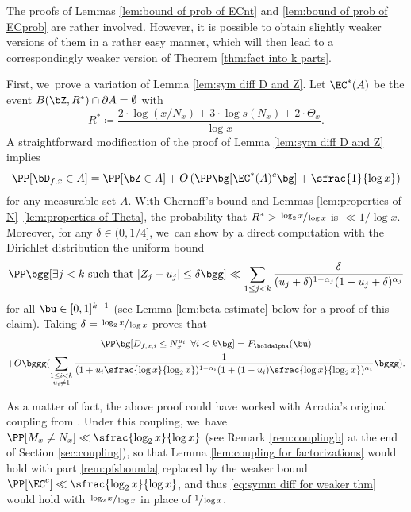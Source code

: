 \skpt
\begin{remss}
\begin{enumeratea}
\item\label{rem:pfsbounda}
The proofs of Lemmas \ref{lem:bound of prob of ECnt} and \ref{lem:bound of prob of ECprob} are rather involved. However, it is possible to obtain slightly weaker versions of them in a rather easy manner, which will then lead to a correspondingly weaker version of Theorem \ref{thm:fact into k parts}.

First, we~prove a variation of Lemma \ref{lem:sym diff D and Z}. Let $\EC^*(A)$ be the event $B(\bZ,R^*)\cap \partial A=\emptyset$ with
\[
R^* \coloneqq \frac{2\cdot \log(x/N_x) + 3\cdot \log s(N_x) + 2\cdot \Theta_x}{\log x}.
\]
A straightforward modification of the proof of Lemma \ref{lem:sym diff D and Z} implies
\begin{equation}
\label{eq:symm diff for weaker thm}
\PP[\bD_{f, x} \in A] = \PP[\bZ \in A] + O\left(\PP\bg[\EC^*(A)^c\bg] + \sfrac{1}{\log x}\right)
\end{equation}
for any measurable set $A$. With Chernoff's bound and Lemmas \ref{lem:properties of N}--\ref{lem:properties of Theta}, the probability that $R^*>\sfrac{\log_2 x}{\log x}$ is $\ll 1/\log x$. Moreover, for any $\delta\in(0,1/4]$, we~can show by a direct computation with the Dirichlet distribution the uniform bound
\[
\PP\bgg[\exists j < k\ \text{such that}\ |Z_j-u_j|\le \delta \bgg] \ll \sum_{1\le j<k} \frac{\delta}{(u_j+\delta)^{1-\alpha_j}(1-u_j+\delta)^{\alpha_j}}
\]
for all $\bu\in [0,1]^{k-1}$ (see Lemma \ref{lem:beta estimate} below for a proof of this claim). Taking \hbox{$\delta=\sfrac{\log_2x}{\log x}$} proves that
\begin{multline*}
\PP\bg[D_{f,x,i} \le N_x^{u_i}\ \, \forall i < k\bg] = F_{\boldalpha}(\bu) \\
+ O\bggg(\sum_{\substack{1 \le i < k \\ u_i \ne 1}} \frac{1}{(1+u_i\sfrac{\log x}{\log_2x})^{1-\alpha_i}(1+(1-u_i)\sfrac{\log x}{\log_2x})^{\alpha_i}}\bggg).
\end{multline*}

\item\label{rem:pfsboundb}
As a matter of fact, the above proof could have worked with Arratia's original coupling from \cite{Arratia02}. Under this coupling, we~have $\PP[M_x \ne N_x] \ll \sfrac{\log_2x}{\log x}$ (see Remark \eqref{rem:couplingb} at the end of Section \ref{sec:coupling}), so that Lemma \ref{lem:coupling for factorizations} would hold with part \eqref{rem:pfsbounda} replaced by the weaker bound $\PP[\EC^c]\ll \sfrac{\log_2x}{\log x}$, and thus \eqref{eq:symm diff for weaker thm} would hold with $\sfrac{\log_2x}{\log x}$ in place of $\sfrac{1}{\log x}$.
\end{enumeratea}
\end{remss}

